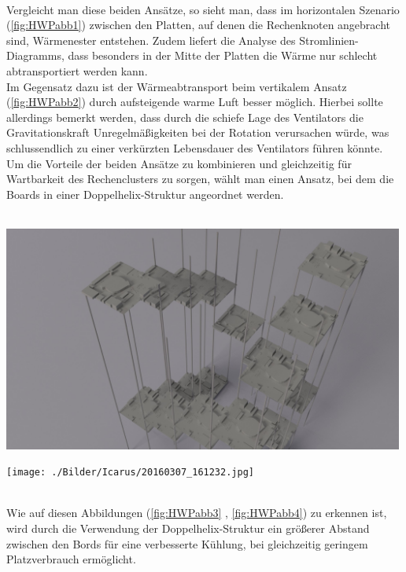 ~\\
Vergleicht man diese beiden Ansätze, so sieht man, dass im horizontalen Szenario (\ref{fig:HWPabb1}) zwischen den 
Platten, auf denen die Rechenknoten angebracht sind, Wärmenester entstehen. Zudem liefert die
Analyse des Stromlinien-Diagramms, dass besonders in der Mitte der Platten die Wärme nur schlecht  
abtransportiert werden kann.\\
Im Gegensatz dazu ist der Wärmeabtransport beim vertikalem Ansatz (\ref{fig:HWPabb2}) durch aufsteigende warme Luft
besser möglich. Hierbei sollte allerdings bemerkt werden, dass durch die schiefe Lage des Ventilators
die Gravitationskraft Unregelmäßigkeiten bei der Rotation verursachen würde, was schlussendlich zu einer verkürzten Lebensdauer des Ventilators führen könnte.\\
Um die Vorteile der beiden Ansätze zu kombinieren und gleichzeitig für Wartbarkeit des 
Rechenclusters zu sorgen, wählt man einen Ansatz, bei dem die Boards in einer Doppelhelix-Struktur 
angeordnet werden.\\
~\\
\begin{minipage}{0.50\textwidth}
\centering
	\includegraphics[width=0.99\textwidth]{./Bilder/Server-Aufbau/render3.jpg}
	\label{fig:HWPabb3}
\end{minipage}
\hfill
\begin{minipage}{0.50\textwidth}
\centering
	\texttt{[image: ./Bilder/Icarus/20160307\_161232.jpg]}
	\label{fig:HWPabb4}
\end{minipage}
~\\
Wie auf diesen Abbildungen (\ref{fig:HWPabb3} , \ref{fig:HWPabb4}) zu erkennen ist, wird durch die Verwendung der Doppelhelix-Struktur
ein größerer Abstand zwischen den Bords für eine verbesserte Kühlung, bei gleichzeitig geringem
Platzverbrauch ermöglicht.\\ 
